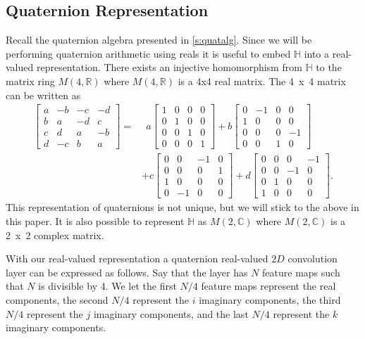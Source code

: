 \subsection{Quaternion Representation}
Recall the quaternion algebra presented in \ref{s:quatalg}.
Since we will be performing quaternion arithmetic using reals it is useful to embed $\mathbb{H}$ into a real-valued representation.
There exists an injective homomorphism from $\mathbb{H}$ to the matrix ring $M(4,\mathbb{R})$ where $M(4,\mathbb{R})$ is a 4x4 real matrix.
The 4~x~4 matrix can be written as
\begin{align}
\begin{bmatrix}
 a & -b & -c & -d \\ 
 b & a & -d & c \\
 c & d & a & -b \\
 d & -c & b & a 
\end{bmatrix}= &~~a
\begin{bmatrix}
 1 & 0 & 0 & 0 \\ 
 0 & 1 & 0 & 0 \\
 0 & 0 & 1 & 0 \\
 0 & 0 & 0 & 1 
\end{bmatrix}
\nonumber + b 
\begin{bmatrix}
 0 & -1 & 0 & 0 \\ 
 1 & 0 & 0 & 0 \\
 0 & 0 & 0 & -1 \\
 0 & 0 & 1 & 0 
\end{bmatrix}
\nonumber \\ &+ c
\begin{bmatrix}
 0 & 0 & -1 & 0 \\ 
 0 & 0 & 0 & 1 \\
 1 & 0 & 0 & 0 \\
 0 & -1 & 0 & 0 
\end{bmatrix}
\nonumber + d
\begin{bmatrix}
 0 & 0 & 0 & -1 \\ 
 0 & 0 & -1 & 0 \\
 0 & 1 & 0 & 0 \\
 1 & 0 & 0 & 0 
\end{bmatrix}.
\label{eq:m4r}
\end{align}
This representation of quaternions is not unique, but we will stick to the above in this paper.
It is also possible to represent $\mathbb{H}$ as $M(2,\mathbb{C})$ where $M(2,\mathbb{C})$ is a 2~x~2 complex matrix.

With our real-valued representation a quaternion real-valued $2D$ convolution layer can be expressed as follows. 
Say that the layer has $N$ feature maps such that $N$ is divisible by 4.
We let the first $N/4$ feature maps represent the real components, the second $N/4$ represent the $i$ imaginary components, the third $N/4$ represent the $j$ imaginary components, and the last $N/4$ represent the $k$ imaginary components.



